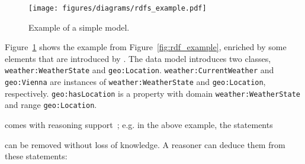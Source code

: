 \begin{figure}
\centering
\texttt{[image: figures/diagrams/rdfs\_example.pdf]}
\caption{Example of a simple  model.}
\label{fig:rdfs_example}
\end{figure}

Figure~\ref{fig:rdfs_example} shows the example from Figure~\ref{fig:rdf_example}, enriched by some elements that are introduced by . The data model introduces two classes, \texttt{weather:\hspace{0pt}Weather\hspace{0pt}State} and \texttt{geo:\hspace{0pt}Location}. \texttt{weather:\hspace{0pt}CurrentWeather} and \texttt{geo:\hspace{0pt}Vienna} are instances of \texttt{weather:\hspace{0pt}Weather\hspace{0pt}State} and \texttt{geo:\hspace{0pt}Location}, respectively. \texttt{geo:\hspace{0pt}has\hspace{0pt}Location} is a property with domain \texttt{weather:\hspace{0pt}Weather\hspace{0pt}State} and range \texttt{geo:\hspace{0pt}Location}.

 comes with reasoning support~\cite{RDF_semantics}; e.g. in the above example, the statements

\noindent{}

can be removed without loss of knowledge. A reasoner can deduce them from these statements:

